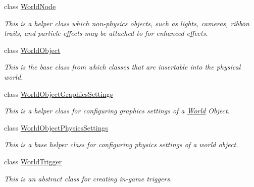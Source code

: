\begin{DoxyCompactItemize}
class \hyperlink{classMezzanine_1_1WorldNode}{WorldNode}
\begin{DoxyCompactList}\small\item\em This is a helper class which non-\/physics objects, such as lights, cameras, ribbon trails, and particle effects may be attached to for enhanced effects. \item\end{DoxyCompactList}\item 
class \hyperlink{classMezzanine_1_1WorldObject}{WorldObject}
\begin{DoxyCompactList}\small\item\em This is the base class from which classes that are insertable into the physical world. \item\end{DoxyCompactList}\item 
class \hyperlink{classMezzanine_1_1WorldObjectGraphicsSettings}{WorldObjectGraphicsSettings}
\begin{DoxyCompactList}\small\item\em This is a helper class for configuring graphics settings of a \hyperlink{classMezzanine_1_1World}{World} Object. \item\end{DoxyCompactList}\item 
class \hyperlink{classMezzanine_1_1WorldObjectPhysicsSettings}{WorldObjectPhysicsSettings}
\begin{DoxyCompactList}\small\item\em This is a base helper class for configuring physics settings of a world object. \item\end{DoxyCompactList}\item 
class \hyperlink{classMezzanine_1_1WorldTrigger}{WorldTrigger}
\begin{DoxyCompactList}\small\item\em This is an abstract class for creating in-\/game triggers. \item\end{DoxyCompactList}\end{DoxyCompactItemize}
